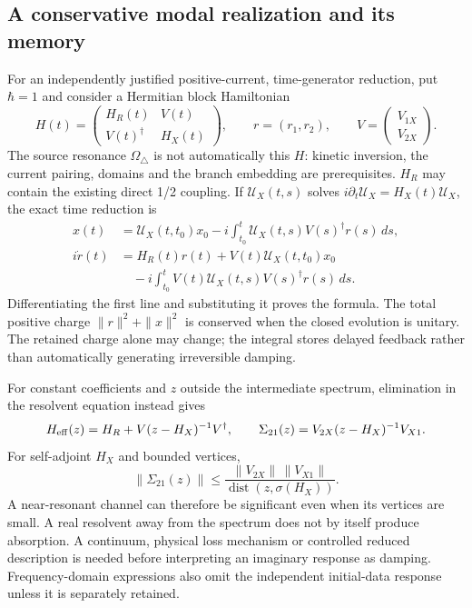 \documentclass[11pt,a4paper]{article}
\begin{document}
\subsection{A conservative modal realization and its memory}

For an independently justified positive-current, time-generator
reduction, put $\hbar=1$ and consider a Hermitian block Hamiltonian
\[
 H(t)=\begin{pmatrix}H_R(t)&V(t)\\V(t)^\dagger&H_X(t)\end{pmatrix},
 \qquad r=(r_1,r_2),\qquad V=\begin{pmatrix}V_{1X}\\V_{2X}\end{pmatrix}.
\]
The source resonance $\Omega_\triangle$ is not automatically this
$H$: kinetic inversion, the current pairing, domains and the
branch embedding are prerequisites. $H_R$ may contain the existing
direct 1/2 coupling. If $\mathcal U_X(t,s)$ solves
$i\partial_t\mathcal U_X=H_X(t)\mathcal U_X$, the exact time
reduction is
\begin{align*}
 x(t)&=\mathcal U_X(t,t_0)x_0
       -i\int_{t_0}^t\mathcal U_X(t,s)V(s)^\dagger r(s)\,ds,\\
 i\dot r(t)&=H_R(t)r(t)+V(t)\mathcal U_X(t,t_0)x_0\\
 &\quad-i\int_{t_0}^t
        V(t)\mathcal U_X(t,s)V(s)^\dagger r(s)\,ds.
\end{align*}
Differentiating the first line and substituting it proves the
formula. The total positive charge $\|r\|^2+\|x\|^2$ is conserved
when the closed evolution is unitary. The retained charge alone
may change; the integral stores delayed feedback rather than
automatically generating irreversible damping.

For constant coefficients and $z$ outside the intermediate
spectrum, elimination in the resolvent equation instead gives
\[
 H_{\rm eff}(z)=H_R+V(z-H_X)^{-1}V^\dagger,
 \qquad \Sigma_{21}(z)=V_{2X}(z-H_X)^{-1}V_{X1}.
\]
For self-adjoint $H_X$ and bounded vertices,
\[
 \|\Sigma_{21}(z)\|
 \le\frac{\|V_{2X}\|\,\|V_{X1}\|}
 {\operatorname{dist}(z,\sigma(H_X))}.
\]
A near-resonant channel can therefore be significant even when
its vertices are small. A real resolvent away from the spectrum
does not by itself produce absorption. A continuum, physical
loss mechanism or controlled reduced description is needed before
interpreting an imaginary response as damping. Frequency-domain
expressions also omit the independent initial-data response unless
it is separately retained.
\end{document}
